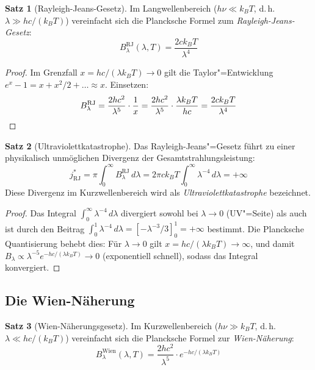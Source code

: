 ﻿\documentclass[a4paper,12pt]{article}
\theoremstyle{definition}
\newtheorem{satz}{Satz}
\begin{document}
\begin{satz}[Rayleigh-Jeans-Gesetz]
\label{satz:rj}
    Im Langwellenbereich ($h\nu \ll k_B T$, d.\,h.\ $\lambda \gg hc/(k_BT)$)
    vereinfacht sich die Plancksche Formel zum \emph{Rayleigh-Jeans-Gesetz}:
    \[
        B_\lambda^{\text{RJ}}(\lambda, T)
        = \frac{2ck_BT}{\lambda^4}
    \]
\end{satz}

\begin{proof}
    Im Grenzfall $x = hc/(\lambda k_BT) \to 0$ gilt die Taylor"=Entwicklung
    $e^x - 1 = x + x^2/2 + \ldots \approx x$. Einsetzen:
    \[
        B_\lambda^{\text{RJ}} = \frac{2hc^2}{\lambda^5} \cdot \frac{1}{x}
        = \frac{2hc^2}{\lambda^5} \cdot \frac{\lambda k_BT}{hc}
        = \frac{2ck_BT}{\lambda^4} \qedhere
    \]
\end{proof}

\begin{satz}[Ultraviolettkatastrophe]
\label{satz:uv}
    Das Rayleigh-Jeans"=Gesetz führt zu einer physikalisch unmöglichen Divergenz
    der Gesamtstrahlungsleistung:
    \[
        j^*_{\text{RJ}} = \pi \int_0^\infty B_\lambda^{\text{RJ}}\,d\lambda
        = 2\pi c k_B T \int_0^\infty \lambda^{-4}\,d\lambda = +\infty
    \]
    Diese Divergenz im Kurzwellenbereich wird als \emph{Ultraviolettkatastrophe}
    bezeichnet.
\end{satz}

\begin{proof}
    Das Integral $\int_0^\infty \lambda^{-4}\,d\lambda$ divergiert sowohl bei
    $\lambda \to 0$ (UV"=Seite) als auch ist durch den Beitrag
    $\int_0^1 \lambda^{-4}\,d\lambda = [-\lambda^{-3}/3]_0^1 = +\infty$
    bestimmt. Die Plancksche Quantisierung behebt dies: Für $\lambda \to 0$
    gilt $x = hc/(\lambda k_BT) \to \infty$, und damit
    $B_\lambda \propto \lambda^{-5} e^{-hc/(\lambda k_BT)} \to 0$
    (exponentiell schnell), sodass das Integral konvergiert. \qedhere
\end{proof}

\subsection{Die Wien-Näherung}

\begin{satz}[Wien-Näherungsgesetz]
    Im Kurzwellenbereich ($h\nu \gg k_BT$, d.\,h.\ $\lambda \ll hc/(k_BT)$)
    vereinfacht sich die Plancksche Formel zur \emph{Wien-Näherung}:
    \[
        B_\lambda^{\text{Wien}}(\lambda, T)
        = \frac{2hc^2}{\lambda^5} \cdot e^{-hc/(\lambda k_BT)}
    \]
\end{satz}
\end{document}
